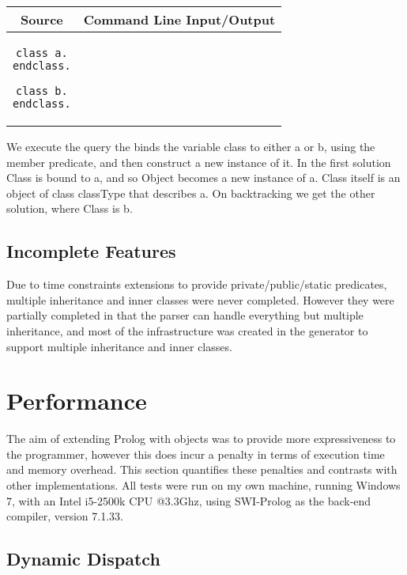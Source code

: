 \documentclass[12pt,a4paper,twoside,openright]{report}
\begin{document}
	\begin{center}
\begin{tabular}{c|c}
Source & Command Line Input/Output \\
\hline
	\small
\begin{lstlisting}
class a.
endclass.

class b.
endclass.
\end{lstlisting}
&
\begin{minipage}{0.5\hsize}
\vspace*{1ex}
\fbox{\usebox{\boxfa}}
\end{minipage}
\\
\end{tabular}
\end{center}

We execute the query the binds the variable class to either a or b, using the member predicate, and then construct a new instance of it. In the first solution Class is bound to a, and so Object becomes a new instance of a. Class itself is an object of class classType that describes a. On backtracking we get the other solution, where Class is b.

\subsection{Incomplete Features}

Due to time constraints extensions to provide private/public/static predicates, multiple inheritance and inner classes were never completed. However they were partially completed in that the parser can handle everything but multiple inheritance, and most of the infrastructure was created in the generator to support multiple inheritance and inner classes.

\section{Performance}

The aim of extending Prolog with objects was to provide more expressiveness to the programmer, however this does incur a penalty in terms of execution time and memory overhead. This section quantifies these penalties and contrasts with other implementations. All tests were run on my own machine, running Windows 7, with an Intel i5-2500k CPU @3.3Ghz, using SWI-Prolog as the back-end compiler, version 7.1.33.

\subsection{Dynamic Dispatch}
\end{document}
